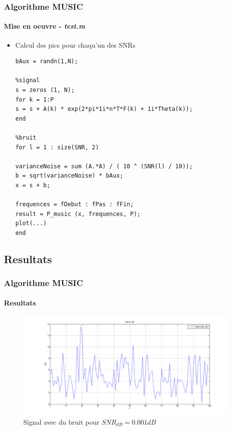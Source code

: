\documentclass[10pt]{beamer}
\begin{document}
\begin{frame}[fragile]
%
\frametitle{Algorithme MUSIC}
\framesubtitle{Mise en oeuvre - \textit{test.m}}
%
%
\begin{itemize}
  
  \item Calcul des pics pour chaqu'un des SNRs
  
  \begin{lstlisting}
bAux = randn(1,N);

%signal
s = zeros (1, N);
for k = 1:P
s = s + A(k) * exp(2*pi*1i*n*T*F(k) + 1i*Theta(k));
end

%bruit
for l = 1 : size(SNR, 2)

varianceNoise = sum (A.*A) / ( 10 ^ (SNR(l) / 10));
b = sqrt(varianceNoise) * bAux;
x = s + b;

frequences = fDebut : fPas : fFin;
result = P_music (x, frequences, P);
plot(...)
end
\end{lstlisting}

\end{itemize}
\end{frame}



\subsection{Resultats}

\begin{frame}
%
\frametitle{Algorithme MUSIC}
\framesubtitle{Resultats}

\begin{figure}[h]
\centering
\includegraphics[scale= 0.28 ]{images/wave0001}
\caption{Signal avec du bruit pour \(SNR_{dB} = 0.001 dB\)}
\label{fig:snr0001}
\end{figure}

\end{frame}
\end{document}
